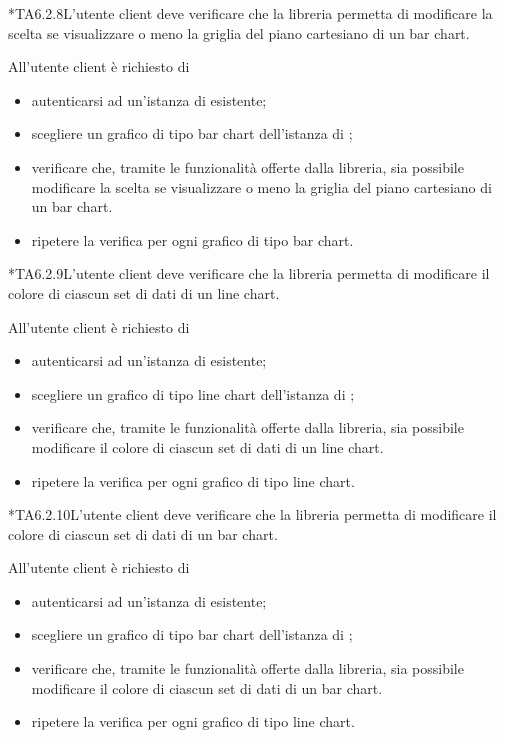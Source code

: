 	*{TA6.2.8}L'utente client deve verificare che la libreria permetta di modificare la scelta se visualizzare o meno la griglia del piano cartesiano di un bar chart.
		
		All'utente client è richiesto di
		\begin{itemize}
			\item autenticarsi ad un'istanza di \projectname{} esistente;
			\item scegliere un grafico di tipo bar chart dell'istanza di \projectname{};
			\item verificare che, tramite le funzionalità offerte dalla libreria, sia possibile modificare la scelta se visualizzare o meno la griglia del piano cartesiano di un bar chart.
			\item ripetere la verifica per ogni grafico di tipo bar chart.
		\end{itemize}

	*{TA6.2.9}L'utente client deve verificare che la libreria permetta di modificare il colore di ciascun set di dati di un line chart.
		
		All'utente client è richiesto di
		\begin{itemize}
			\item autenticarsi ad un'istanza di \projectname{} esistente;
			\item scegliere un grafico di tipo line chart dell'istanza di \projectname{};
			\item verificare che, tramite le funzionalità offerte dalla libreria, sia possibile modificare il colore di ciascun set di dati di un line chart.
			\item ripetere la verifica per ogni grafico di tipo line chart.
		\end{itemize}

	*{TA6.2.10}L'utente client deve verificare che la libreria permetta di modificare il colore di ciascun set di dati di un bar chart.
		
		All'utente client è richiesto di
		\begin{itemize}
			\item autenticarsi ad un'istanza di \projectname{} esistente;
			\item scegliere un grafico di tipo bar chart dell'istanza di \projectname{};
			\item verificare che, tramite le funzionalità offerte dalla libreria, sia possibile modificare il colore di ciascun set di dati di un bar chart.
			\item ripetere la verifica per ogni grafico di tipo line chart.
		\end{itemize}


